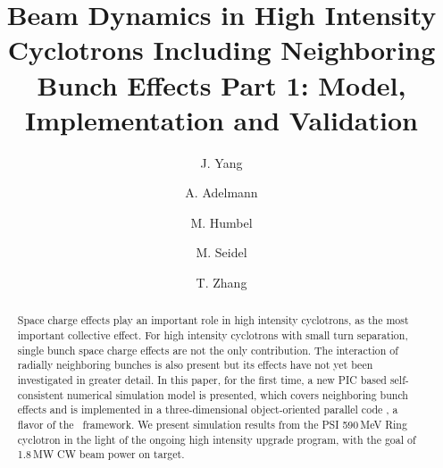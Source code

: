 \documentclass[aps,prstab,twocolumn,superscriptaddress]{revtex4}
\begin{document}

\title{Beam Dynamics in High Intensity Cyclotrons Including Neighboring Bunch Effects Part 1: Model, Implementation and Validation}


\author{J. Yang}
\author{A. Adelmann}
\author{M. Humbel}
\author{M. Seidel}
\author{T. Zhang} 

\noaffiliation

\begin{abstract}
Space charge effects play an important role in high intensity cyclotrons, as the most important collective effect. 
For high intensity cyclotrons with small turn separation, single bunch space charge effects are not the only contribution. 
The interaction of radially neighboring bunches is also present but its effects have not yet been investigated in greater detail.
In this paper, for the first time, a new PIC based self-consistent numerical simulation model is presented, 
which covers neighboring bunch effects and is implemented in a three-dimensional object-oriented parallel code \opalcycl,
a flavor of the \opal \  framework. 
We present simulation results from the PSI 590\,MeV Ring cyclotron in the light of the ongoing high intensity upgrade program,
with the goal of 1.8\,MW CW beam power on target.
\end{abstract}
\end{document}
